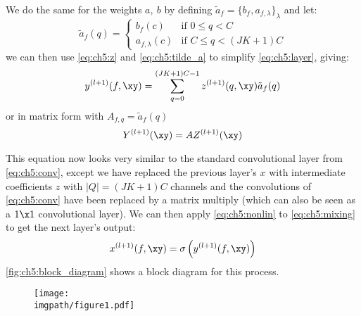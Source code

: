 We do the same for the weights $a,\ b$ by defining $\tilde{a}_f = \{b_f, a_{f,
\lambda} \}_{\lambda}$ and let:
\begin{equation}
  \tilde{a}_f(q) =  \left\{
    \begin{array}{ll}
      b_f(c) & \mbox{if } 0 \leq q < C \\
      a_{f, \lambda}(c) & \mbox{if }	C \leq q < (JK+1)C
    \end{array}
    \right. \label{eq:ch5:tilde_a}
\end{equation}
%
we can then use \eqref{eq:ch5:z} and \eqref{eq:ch5:tilde_a} to simplify 
\eqref{eq:ch5:layer}, giving:
\begin{equation}
  y^{(l+1)}(f, \xy)  =  \sum_{q=0}^{(JK + 1)C - 1} z^{(l+1)}(q, \xy) \tilde{a}_f(q) \label{eq:ch5:mixing}
\end{equation}
or in matrix form with $A_{f,q} = \tilde{a}_f(q)$
%
\begin{equation}
  Y^{(l+1)}(\xy)  =  A Z^{(l+1)}(\xy) \label{eq:ch5:matrix}
\end{equation}

This equation now looks very similar to the standard convolutional layer from
\eqref{eq:ch5:conv}, except we have replaced the previous layer's $x$ with
intermediate coefficients $z$ with $|Q| = (JK+1)C$ channels and the
convolutions of \eqref{eq:ch5:conv} have been replaced by a matrix multiply
(which can also be seen as a $1\x 1$ convolutional layer). We can then apply
\eqref{eq:ch5:nonlin} to \eqref{eq:ch5:mixing} to get the next layer's output:
%
\begin{equation}
  x^{(l+1)}(f, \xy) = \sigma\left( y^{(l+1)}(f, \xy) \right)
  \label{eq:ch5:xnext}
\end{equation}
\autoref{fig:ch5:block_diagram} shows a block diagram for this process. 

\begin{figure}[t!]
  \centering
  \texttt{[image: \\imgpath/figure1.pdf]}
  \label{fig:ch5:block_diagram}
\end{figure}

